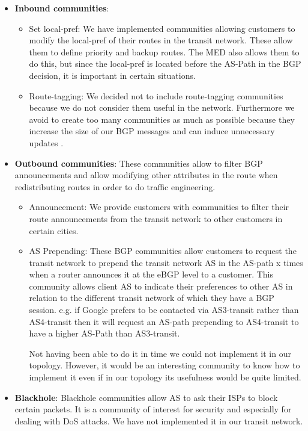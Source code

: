 \documentclass[letter, 9pt, conference]{ieeeconf}
\begin{document}
\begin{itemize}
    \item \textbf{Inbound communities}: 
    
    \begin{itemize}
        \item Set local-pref: We have implemented communities allowing customers to modify the local-pref of their routes in the transit network. These allow them to define priority and backup routes. The MED also allows them to do this, but since the local-pref is located before the AS-Path in the BGP decision, it is important in certain situations.
        
        \item Route-tagging: We decided not to include route-tagging communities because we do not consider them useful in the network. Furthermore we avoid to create too many communities as much as possible because they increase the size of our BGP messages and can induce unnecessary updates  \cite{impact_communities}.
    \end{itemize}
    
    \item \textbf{Outbound communities}: These communities allow to filter BGP announcements and allow modifying other attributes in the route when redistributing routes in order to do traffic engineering.
    
    \begin{itemize}
        \item Announcement:  We provide customers with communities to filter their route announcements from the transit network to other customers in certain cities. 
        
        \item AS Prepending: These BGP communities allow customers to request the transit network to prepend the transit network AS in the AS-path x times when a router announces it at the eBGP level to a customer. This community allows client AS to indicate their preferences to other AS in relation to the different transit network of which they have a BGP session. 
        e.g. if Google prefers to be contacted via AS3-transit rather than AS4-transit then it will request an AS-path prepending to AS4-transit to have a higher AS-Path than AS3-transit.
        
        Not having been able to do it in time we could not implement it in our topology. However, it would be an interesting community to know how to implement it even if in our topology its usefulness would be quite limited.

    \end{itemize}
    
    \item \textbf{Blackhole}: Blackhole communities allow AS to ask their ISPs to block certain packets. It is a community of interest for security and especially for dealing with DoS attacks.
    We have not implemented it in our transit network. 
    
\end{itemize}
\end{document}
